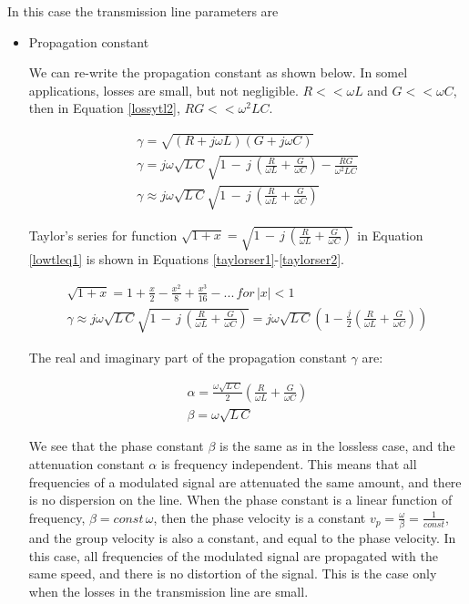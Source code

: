 \documentclass{ximera}
\begin{document}
In this case the transmission line parameters are
\begin{itemize}
\item Propagation constant

We can re-write the propagation constant as shown below. 
In somel applications,  losses are small, but not negligible.  $R<< \omega L$ and $G <<  \omega C$, then
in Equation \ref{lossytl2}, $ RG<< \omega^2 LC$.

\begin{eqnarray}
\gamma =\sqrt{(R+j\omega L)(G+ j\omega C)}   \\ 
\gamma= j\omega \sqrt{ L\, C}\sqrt{1\,-\,j\,\left( \frac{R}{\omega L}+\frac{G}{\omega C} \right)-\frac{R G}{\omega^2  L  C}} \label{lossytl2} \\ 
\gamma\approx j\omega \sqrt{ L\, C}\sqrt{1\,-\,j\,\left( \frac{R}{\omega L}+\frac{G}{\omega C} \right)}\label{lowtleq1}
\end{eqnarray}

Taylor's series for function $\sqrt{1+x}= \sqrt{1\,-\,j\,\left( \frac{R}{\omega L}+\frac{G}{\omega C} \right)}$ in Equation \ref{lowtleq1} is shown in Equations \ref{taylorser1}-\ref{taylorser2}.

\begin{eqnarray}
\sqrt{1+x}=1+\frac{x}{2}-\frac{x^2}{8}+\frac{x^3}{16}-...  \,for\, |x|<1 \label{taylorser1} \\
\gamma \approx  j\omega \sqrt{ L\, C} \sqrt{1\,-\,j\,\left( \frac{R}{\omega L}+\frac{G}{\omega C} \right)}= j\omega \sqrt{ L\, C}\left(1-\frac{j}{2} \left(  \frac{R}{\omega L}+\frac{G}{\omega C} \right)\right) \label{taylorser2}
\end{eqnarray}


The real and imaginary part of the propagation constant  $\gamma$ are:

\begin{eqnarray}
\alpha=  \frac{   \omega \sqrt{ L\, C}  }{2} \left(  \frac{R}{\omega L}+\frac{G}{\omega C} \right)  \\
\beta=     \omega \sqrt{ L\, C}
\end{eqnarray}


We see that the phase constant $\beta$ is the same as in the lossless case, and the attenuation constant $\alpha$ is frequency independent. This means that all frequencies of a modulated signal are attenuated the same amount, and there is no dispersion on the line. When the phase constant is a linear function of frequency, $\beta=const \, \omega$, then the phase velocity is a constant $v_p=\frac{\omega}{\beta}=\frac{1}{const}$, and the group velocity is also a constant, and equal to the phase velocity. In this case, all frequencies of the modulated signal are propagated with the same speed, and there is no distortion of the signal. This is the case only when the losses in the transmission line are small. 


\end{itemize}
\end{document}
